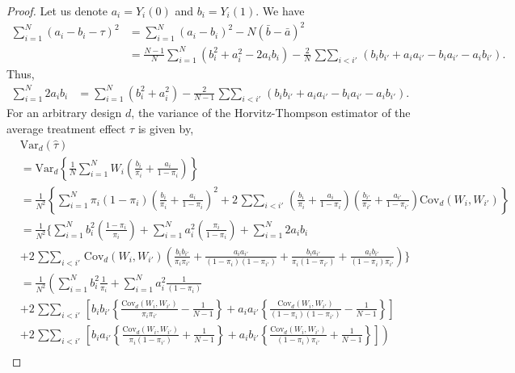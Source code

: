\documentclass[12pt]{article}
\newcommand{\Var}{{\text{Var}}}
\newcommand{\Cov}{{\text{Cov}}}
\begin{document}
\begin{proof}
Let us denote $a_i = Y_i(0)$ and $b_i = Y_i(1)$. We have 
\begin{align}
\sum_{i=1}^{N}(a_i - b_i - \tau)^2 &= \sum_{i=1}^{N}(a_i - b_i)^2 - N(\bar{b} - \bar{a})^2 \nonumber\\
& = \frac{N-1}{N}\sum_{i=1}^{N}(b^2_i + a^2_i -2a_ib_i) - \frac{2}{N}\mathop{\sum\sum}_{i<i'}(b_ib_{i'} + a_ia_{i'} - b_ia_{i'}- a_ib_{i'}).
\end{align}
Thus, 
\begin{align}
    \sum_{i=1}^{N}2a_ib_i & = \sum_{i=1}^{N}(b^2_i + a^2_i) - \frac{2}{N-1}\mathop{\sum\sum}_{i<i'}(b_ib_{i'} + a_ia_{i'} - b_ia_{i'}- a_ib_{i'}).
    \label{eq_A_2ab}
\end{align}
For an arbitrary design $d$, the variance of the Horvitz-Thompson estimator of the average treatment effect $\tau$ is given by,
\begin{align}
   & \Var_d(\hat{\tau}) \nonumber\\
   & = \Var_d\left\{\frac{1}{N}\sum_{i=1}^{N}W_i\left(\frac{b_i}{\pi_i} + \frac{a_i}{1-\pi_i}\right) \right\} \nonumber \\
    & = \frac{1}{N^2}\left\{\sum_{i=1}^{N}\pi_i(1-\pi_i)\left(\frac{b_i}{\pi_i} + \frac{a_i}{1 - \pi_i} \right)^2 + 2\mathop{\sum\sum}_{i<i'}\left(\frac{b_i}{\pi_i} + \frac{a_i}{1-\pi_i}\right) \left(\frac{b_{i'}}{\pi_{i'}} + \frac{a_{i'}}{1-\pi_{i'}}\right)\Cov_d(W_i,W_{i'})  \right\} \nonumber\\
    & = \frac{1}{N^2} \Big\{\sum_{i=1}^{N} b^2_i \left(\frac{1-\pi_i}{\pi_i} \right) + \sum_{i=1}^{N} a^2_i \left(\frac{\pi_i}{1-\pi_i} \right) + \sum_{i=1}^{N}2a_ib_i \nonumber\\
    & + 2\mathop{\sum\sum}_{i<i'}\Cov_d(W_i,W_{i'})\left(\frac{b_ib_{i'}}{\pi_i \pi_{i'}} + \frac{a_ia_{i'}}{(1-\pi_i) (1-\pi_{i'})}  + \frac{b_ia_{i'}}{\pi_i (1-\pi_{i'})} + \frac{a_ib_{i'}}{(1-\pi_i) \pi_{i'}} \right) \Big\} \nonumber \\
    & = \frac{1}{N^2}\left(\sum_{i=1}^{N} b^2_i \frac{1}{\pi_i} + \sum_{i=1}^{N} a^2_i \frac{1}{(1-\pi_i)} \right.\nonumber \\
& + 2\mathop{\sum\sum}_{i<i'}\left[b_ib_{i'}\left\{\frac{\Cov_d(W_i,W_{i'})}{\pi_i \pi_{i'}} - \frac{1}{N-1}\right\} + a_ia_{i'}\left\{\frac{\Cov_d(W_i,W_{i'})}{(1-\pi_i) (1-\pi_{i'})} - \frac{1}{N-1} \right\} \right] \nonumber \\
& + \left. 2\mathop{\sum\sum}_{i<i'}\left[b_ia_{i'}\left\{\frac{\Cov_d(W_i,W_{i'})}{\pi_i (1- \pi_{i'})} + \frac{1}{N-1}\right\} + a_ib_{i'}\left\{\frac{\Cov_d(W_i,W_{i'})}{(1-\pi_i) \pi_{i'}} + \frac{1}{N-1} \right\} \right]\right) \nonumber\\

\end{align}
\end{proof}
\end{document}
